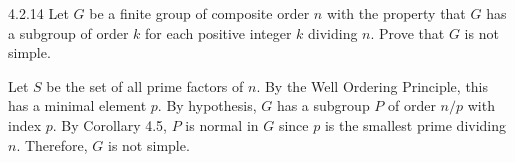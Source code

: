 \begin{exercise}{4.2.14}
	Let $G$ be a finite group of composite order $n$ with the property that $G$ has a subgroup of order $k$ for each positive integer $k$ dividing $n$.
	Prove that $G$ is not simple.
\end{exercise}

\begin{sol}
	Let $S$ be the set of all prime factors of $n$.
	By the Well Ordering Principle, this has a minimal element $p$.
	By hypothesis, $G$ has a subgroup $P$ of order $n/p$ with index $p$.
	By Corollary 4.5, $P$ is normal in $G$ since $p$ is the smallest prime dividing $n$.
	Therefore, $G$ is not simple.
\end{sol}